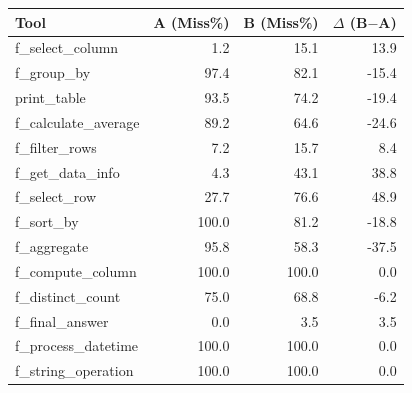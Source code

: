 \begin{tabular}{lrrr}
\toprule
Tool & A (Miss\%) & B (Miss\%) & $\Delta$ (B$-$A) \\
\midrule
f_select_column & 1.2 & 15.1 & 13.9 \\
f_group_by & 97.4 & 82.1 & -15.4 \\
print_table & 93.5 & 74.2 & -19.4 \\
f_calculate_average & 89.2 & 64.6 & -24.6 \\
f_filter_rows & 7.2 & 15.7 & 8.4 \\
f_get_data_info & 4.3 & 43.1 & 38.8 \\
f_select_row & 27.7 & 76.6 & 48.9 \\
f_sort_by & 100.0 & 81.2 & -18.8 \\
f_aggregate & 95.8 & 58.3 & -37.5 \\
f_compute_column & 100.0 & 100.0 & 0.0 \\
f_distinct_count & 75.0 & 68.8 & -6.2 \\
f_final_answer & 0.0 & 3.5 & 3.5 \\
f_process_datetime & 100.0 & 100.0 & 0.0 \\
f_string_operation & 100.0 & 100.0 & 0.0 \\
\bottomrule
\end{tabular}